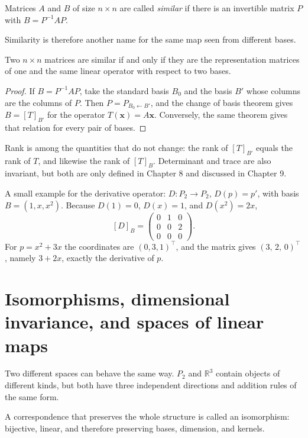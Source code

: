 \begin{definisi}
Matrices $A$ and $B$ of size $n\times n$ are called \emph{similar} if there is an invertible
matrix $P$ with $B=P^{-1}AP$.
\end{definisi}

Similarity is therefore another name for the same map seen from different bases.

\begin{proposisi}
Two $n\times n$ matrices are similar if and only if they are the representation matrices of
one and the same linear operator with respect to two bases.
\end{proposisi}

\begin{proof}
If $B=P^{-1}AP$, take the standard basis $B_{0}$ and the basis $B'$ whose columns are
the columns of $P$. Then $P=P_{B_{0}\leftarrow B'}$, and the change of basis theorem gives
$B=[T]_{B'}$ for the operator $T(\mathbf{x})=A\mathbf{x}$. Conversely, the same theorem
gives
that relation for every pair of bases.
\end{proof}

Rank is among the quantities that do not change: the rank of $[T]_{B'}$ equals the rank of $T$,
and likewise the rank of $[T]_{B}$. Determinant and trace are also invariant, but both are only
defined in Chapter 8 and discussed in Chapter 9.

A small example for the derivative operator: $D\colon P_{2}\to P_{2}$, $D(p)=p'$, with basis
$B=(1,x,x^{2})$. Because $D(1)=0$, $D(x)=1$, and $D(x^{2})=2x$,
\[
  [D]_{B}=\begin{pmatrix}0&1&0\\ 0&0&2\\ 0&0&0\end{pmatrix}.
\]
For $p=x^{2}+3x$ the coordinates are $(0,3,1)^{\top}$, and the matrix gives $(3,\,2,\,0)^{\top}$,
namely $3+2x$, exactly the derivative of $p$.

\section{Isomorphisms, dimensional invariance, and spaces of linear maps}

Two different spaces can behave the same way. $P_{2}$ and $\mathbb{R}^{3}$ contain objects
of different kinds, but both have three independent directions and addition rules of the same
form.

A correspondence that preserves the whole structure is called an isomorphism: bijective,
linear, and therefore preserving bases, dimension, and kernels.

